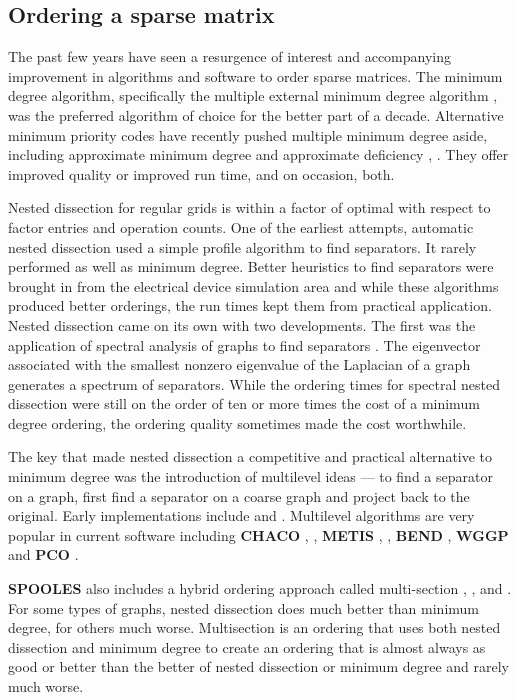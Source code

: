 \subsection{Ordering a sparse matrix}
\label{subsection:intro:ordering}
\par
The past few years have seen a resurgence of interest and
accompanying improvement in algorithms and software to order sparse
matrices.
The minimum degree algorithm, specifically the multiple external
minimum degree algorithm \cite{liu85-mmd},
was the preferred algorithm of choice for
the better part of a decade.
Alternative minimum priority codes have recently pushed multiple
minimum degree aside,
including approximate minimum degree \cite{ame96-amd} and
approximate deficiency \cite{ng96-mindefIdaho},
\cite{rot96-mindefIdaho}.
They offer improved quality or improved run time, and on occasion,
both. 
\par
Nested dissection for regular grids \cite{geo73-nested} is within a
factor of optimal with respect to factor entries and operation counts.
One of the earliest attempts, automatic nested dissection 
\cite{geo81-book} used a simple profile algorithm to find separators.
It rarely performed as well as minimum degree.
Better heuristics to find separators were brought in from the
electrical device simulation area \cite{lei89-fidmat} and while
these algorithms produced better orderings, the run times kept
them from practical application.
Nested dissection came on its own with two developments.
The first was the application of spectral analysis of graphs to
find separators \cite{pot90-partition}.
The eigenvector associated with the smallest nonzero eigenvalue of
the Laplacian of a graph generates a spectrum of separators.
While the ordering times for spectral nested dissection were still
on the order of ten or more times the cost of a minimum degree ordering,
the ordering quality sometimes made the cost worthwhile.
\par
The key that made nested dissection a competitive and practical
alternative to minimum degree was the introduction of multilevel
ideas ---
to find a separator on a graph, first find a separator on a coarse
graph and project back to the original.
Early implementations include \cite{bar93-partition}
and \cite{bui93-partition}.
Multilevel algorithms are very popular in current software
including
{\bf CHACO}
\cite{hen93-chaco},
\cite{hen93-partition},
{\bf METIS}
\cite{kar95-multilevel},
\cite{kar95-metis},
{\bf BEND}
\cite{hr96-msnd},
{\bf WGGP}
\cite{gup96-WGPP}
and
{\bf PCO}
\cite{rag95-PCO}.
\par
{\bf SPOOLES} also includes a hybrid ordering approach called
multi-section 
\cite{ash95-DDSEP},
\cite{ash96-maxflow},
\cite{ash96-multisection} and
\cite{ro95-hybrid}.
For some types of graphs, nested dissection does much better than
minimum degree, for others much worse.
Multisection is an ordering that uses both nested dissection and
minimum degree to create an ordering that is almost always as good
or better than the better of nested dissection or minimum degree
and rarely much worse.
\par
